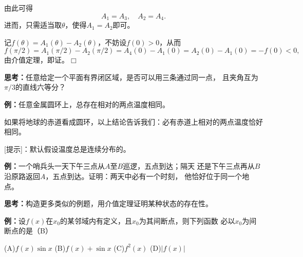 \begin{center}
\end{center}

由此可得
$$A_1=A_3,\quad A_2=A_4.$$
进而，只需适当取$\theta$，使得$A_1=A_2$即可。

记$f(\theta)=A_1(\theta)-A_2(\theta)$，不妨设$f(0)>0$，从而
$$f(\pi/2)=A_1(\pi/2)-A_2(\pi/2)=A_4(0)-A_1(0)=A_2(0)-A_1(0)=-f(0)<0,$$
由介值定理，即证。\hfill$\Box$

{\bf 思考：}任意给定一个平面有界闭区域，是否可以用三条通过同一点，
且夹角互为$\pi/3$的直线六等分？

{\bf 例：}任意金属圆环上，总存在相对的两点温度相同。

如果将地球的赤道看成圆环，以上结论告诉我们：必有赤道上相对的两点温度恰好相同。

[提示]：默认假设温度总是连续分布的。

{\bf 例：}一个哨兵头一天下午三点从$A$至$B$巡逻，五点到达；隔天
还是下午三点再从$B$沿原路返回$A$，五点到达。证明：两天中必有一个时刻，
他恰好位于同一个地点。

{\bf 思考：}构造更多类似的例题，用介值定理证明某种状态的存在性。

{\bf 例：}设$f(x)$在$x_0$的某邻域内有定义，且$x_0$为其间断点，则下列函数
必以$x_0$为间断点的是（B）

\quad
(A)\;$f(x)\sin x$\hspace{2cm}
(B)\;$f(x)+\sin x$\hspace{2cm}
(C)\;$f^2(x)$\hspace{2cm}
(D)\;$|f(x)|$ 

